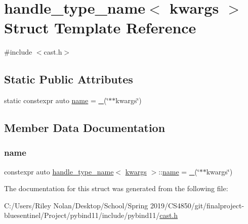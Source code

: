 \hypertarget{structhandle__type__name_3_01kwargs_01_4}{}\section{handle\+\_\+type\+\_\+name$<$ kwargs $>$ Struct Template Reference}
\label{structhandle__type__name_3_01kwargs_01_4}


{\ttfamily \#include $<$cast.\+h$>$}

\subsection*{Static Public Attributes}
\begin{DoxyCompactItemize}
\item 
static constexpr auto \mbox{\hyperlink{structhandle__type__name_3_01kwargs_01_4_a085c56ee6f3dfe7cd227dc78ae1097d2}{name}} = \mbox{\hyperlink{descr_8h_af114703e20c6527e87163eb2798f74b8}{\+\_\+}}(\char`\"{}$\ast$$\ast$kwargs\char`\"{})
\end{DoxyCompactItemize}


\subsection{Member Data Documentation}
\mbox{\label{structhandle__type__name_3_01kwargs_01_4_a085c56ee6f3dfe7cd227dc78ae1097d2}} 
\subsubsection{\texorpdfstring{name}{name}}
{\footnotesize\ttfamily constexpr auto \mbox{\hyperlink{structhandle__type__name}{handle\+\_\+type\+\_\+name}}$<$ \mbox{\hyperlink{classkwargs}{kwargs}} $>$\+::\mbox{\hyperlink{structname}{name}} = \mbox{\hyperlink{descr_8h_af114703e20c6527e87163eb2798f74b8}{\+\_\+}}(\char`\"{}$\ast$$\ast$kwargs\char`\"{})\hspace{0.3cm}{\ttfamily [static]}}



The documentation for this struct was generated from the following file\+:\begin{DoxyCompactItemize}
\item 
C\+:/\+Users/\+Riley Nolan/\+Desktop/\+School/\+Spring 2019/\+C\+S4850/git/finalproject-\/bluesentinel/\+Project/pybind11/include/pybind11/\mbox{\hyperlink{cast_8h}{cast.\+h}}\end{DoxyCompactItemize}
